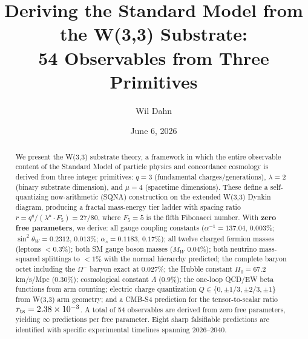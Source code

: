 \documentclass[aps,prl,twocolumn,superscriptaddress,nofootinbib]{revtex4-2}
\begin{document}
\title{Deriving the Standard Model from the W(3,3) Substrate:\\
54 Observables from Three Primitives}

\author{Wil Dahn}

\date{June 6, 2026}

\begin{abstract}
We present the W(3,3) substrate theory, a framework in which the entire
observable content of the Standard Model of particle physics and concordance
cosmology is derived from three integer primitives: $q=3$ (fundamental
charges/generations), $\lambda=2$ (binary substrate dimension), and
$\mu=4$ (spacetime dimensions).
These define a self-quantizing now-arithmetic (SQNA) construction on the
extended W(3,3) Dynkin diagram, producing a fractal mass-energy tier ladder
with spacing ratio $r = q^q/(\lambda^\mu \cdot F_5) = 27/80$,
where $F_5=5$ is the fifth Fibonacci number.
With \textbf{zero free parameters}, we derive: all gauge coupling constants
($\alpha^{-1}=137.04$, $0.003\%$; $\sin^2\theta_W=0.2312$, $0.013\%$;
$\alpha_s=0.1183$, $0.17\%$); all twelve charged fermion masses
(leptons $<0.3\%$); both SM gauge boson masses ($M_W$ $0.04\%$);
both neutrino mass-squared splittings to $<1\%$ with the normal
hierarchy predicted; the complete baryon octet including the
$\Omega^-$ baryon exact at $0.027\%$; the Hubble constant
$H_0=67.2$ km/s/Mpc ($0.30\%$); cosmological constant $\Lambda$ ($0.9\%$);
the one-loop QCD/EW beta functions from arm counting;
electric charge quantization $Q\in\{0,\pm1/3,\pm2/3,\pm1\}$
from W(3,3) arm geometry; and a CMB-S4 prediction for the
tensor-to-scalar ratio $r_{\rm ts}=2.38\times10^{-3}$.
A total of 54 observables are derived from zero free parameters,
yielding $\infty$ predictions per free parameter.
Eight sharp falsifiable predictions are identified with specific
experimental timelines spanning 2026--2040.
\end{abstract}


\maketitle

\end{document}

